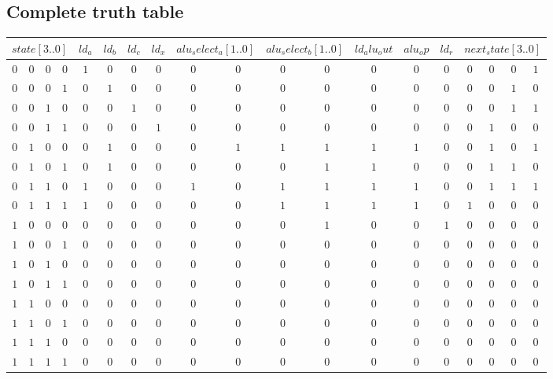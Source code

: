 \documentclass [15pt,a4paper,twoside]{article}
\begin{document}
\subsection{Complete truth table}
\begin{center}
\begin{tabular}{cccc|ccccccccccccccc}
\multicolumn{4}{c|}{$state[3..0]$}&$ld_a$&$ld_b$&$ld_c$&$ld_x$&\multicolumn{2}{c}{$alu_select_a[1..0]$}&\multicolumn{2}{c}{$alu_select_b[1..0]$}&$ld_alu_out$&$alu_op$&$ld_r$&\multicolumn{4}{c}{$next_state[3..0]$}\\
\hline
$0$&$0$&$0$&$0$&$1$&$0$&$0$&$0$&$0$&$0$&$0$&$0$&$0$&$0$&$0$&$0$&$0$&$0$&$1$\\
$0$&$0$&$0$&$1$&$0$&$1$&$0$&$0$&$0$&$0$&$0$&$0$&$0$&$0$&$0$&$0$&$0$&$1$&$0$\\
$0$&$0$&$1$&$0$&$0$&$0$&$1$&$0$&$0$&$0$&$0$&$0$&$0$&$0$&$0$&$0$&$0$&$1$&$1$\\
$0$&$0$&$1$&$1$&$0$&$0$&$0$&$1$&$0$&$0$&$0$&$0$&$0$&$0$&$0$&$0$&$1$&$0$&$0$\\
$0$&$1$&$0$&$0$&$0$&$1$&$0$&$0$&$0$&$1$&$1$&$1$&$1$&$1$&$0$&$0$&$1$&$0$&$1$\\
$0$&$1$&$0$&$1$&$0$&$1$&$0$&$0$&$0$&$0$&$0$&$1$&$1$&$0$&$0$&$0$&$1$&$1$&$0$\\
$0$&$1$&$1$&$0$&$1$&$0$&$0$&$0$&$1$&$0$&$1$&$1$&$1$&$1$&$0$&$0$&$1$&$1$&$1$\\
$0$&$1$&$1$&$1$&$1$&$0$&$0$&$0$&$0$&$0$&$1$&$1$&$1$&$1$&$0$&$1$&$0$&$0$&$0$\\
$1$&$0$&$0$&$0$&$0$&$0$&$0$&$0$&$0$&$0$&$0$&$1$&$0$&$0$&$1$&$0$&$0$&$0$&$0$\\
$1$&$0$&$0$&$1$&$0$&$0$&$0$&$0$&$0$&$0$&$0$&$0$&$0$&$0$&$0$&$0$&$0$&$0$&$0$\\
$1$&$0$&$1$&$0$&$0$&$0$&$0$&$0$&$0$&$0$&$0$&$0$&$0$&$0$&$0$&$0$&$0$&$0$&$0$\\
$1$&$0$&$1$&$1$&$0$&$0$&$0$&$0$&$0$&$0$&$0$&$0$&$0$&$0$&$0$&$0$&$0$&$0$&$0$\\
$1$&$1$&$0$&$0$&$0$&$0$&$0$&$0$&$0$&$0$&$0$&$0$&$0$&$0$&$0$&$0$&$0$&$0$&$0$\\
$1$&$1$&$0$&$1$&$0$&$0$&$0$&$0$&$0$&$0$&$0$&$0$&$0$&$0$&$0$&$0$&$0$&$0$&$0$\\
$1$&$1$&$1$&$0$&$0$&$0$&$0$&$0$&$0$&$0$&$0$&$0$&$0$&$0$&$0$&$0$&$0$&$0$&$0$\\
$1$&$1$&$1$&$1$&$0$&$0$&$0$&$0$&$0$&$0$&$0$&$0$&$0$&$0$&$0$&$0$&$0$&$0$&$0$\\

\end{tabular}
\end{center}
\end{document}
